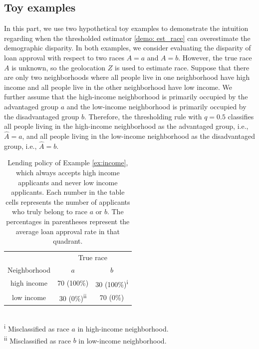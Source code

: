 

\subsection{Toy examples}
\label{sec:toy_examples}

In this part, we use two hypothetical toy examples to demonstrate the intuition regarding when the thresholded estimator \eqref{demo: est_race} can overestimate the demographic disparity. In both examples, we consider evaluating the disparity of loan approval with respect to two races $A = a$ and $A = b$. However, the true race $A$ is unknown, so the geolocation $Z$ is used to estimate race. Suppose that there are only two neighborhoods where all people live in one neighborhood have high income and all people live in the other neighborhood have low income. We further assume that the high-income neighborhood is primarily occupied by the advantaged group $a$ and the low-income neighborhood is primarily occupied by the disadvantaged group $b$. Therefore, the thresholding rule with $q = 0.5$ classifies all people living in the high-income neighborhood as the advantaged group, i.e., $\hat{A} = a$,  and all people living in the low-income neighborhood as the disadvantaged group, i.e., $\hat{A} = b$.

\begin{table}
\centering
\caption{Lending policy of Example \ref{ex:income}, which always accepts high
income applicants and never low income applicants.
Each number in the table cells
represents the number of applicants who truly belong to race $a$ or $b$.
The percentages in parentheses represent the average loan approval
rate in that quadrant.} \label{table:toy1}
\begin{tabular}{c c c}\toprule
& \multicolumn{2}{c}{True race} \\
Neighborhood & $a$ & $b$ \\
\midrule
 high income & 70 (100\%)          & 30 (100\%)\textsuperscript{i} \\
 low income  & 30 (0\%)\textsuperscript{ii} & 70 (0\%) \\
\bottomrule
\end{tabular}\\
\textsuperscript{i} Misclassified as race $a$ in high-income neighborhood.\\
\textsuperscript{ii} Misclassified as race $b$ in low-income neighborhood.
\end{table}

